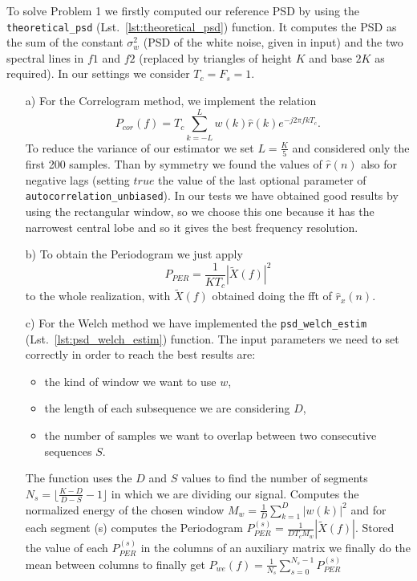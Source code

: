 \documentclass{article}
\newcommand{\inlinecode}[1]{\lstinline[basicstyle=\ttfamily,
    keywordstyle={}]{#1}}
\newcommand{\abs}[1]{\left|#1\right|}
\begin{document}
To solve Problem 1 we firstly computed our reference PSD by using the \inlinecode{theoretical_psd} (Lst.~\ref{lst:theoretical_psd}) function. It computes the PSD as the sum of the constant $\sigma_w^2$ (PSD of the white noise, given in input) and the two spectral lines in $f1$ and $f2$ (replaced by triangles of height $K$ and base $2K$ as required). In our settings we consider $T_c = F_s = 1$.
\begin{itemize}
\item[a)] For the Correlogram method, we implement the relation
  \[ P_{cor}(f) = T_c \sum_{k=-L}^{L} w(k)\hat{r}(k)e^{-j 2 \pi  f k T_c} . \]
  To reduce the variance of our estimator we set $L=\frac{K}{5}$ and considered only the first 200 samples. Than by symmetry we found the values of $\hat{r}(n)$ also for negative lags (setting $true$ the value of the last optional parameter of \inlinecode{autocorrelation_unbiased}). In our tests we have obtained good results by using the rectangular window, so we choose this one because it has the narrowest central lobe and so it gives the best frequency resolution.
 \item[b)] To obtain the Periodogram we just apply
   \[ P_{PER} = \frac{1}{K T_c} |\tilde{X}(f)|^2 \]
   to the whole realization, with $\tilde{X}(f)$ obtained doing the fft of $\hat{r}_x(n)$.
 \item[c)] For the Welch method we have implemented the \inlinecode{psd_welch_estim} (Lst.~\ref{lst:psd_welch_estim}) function. The input parameters we need to set correctly in order to reach the best results are:
 \begin{itemize}
 \item the kind of window we want to use $w$,
 \item the length of each subsequence we are considering $D$, 
 \item the number of samples we want to overlap between two consecutive sequences $S$. 
\end{itemize} 
The function uses the $D$ and $S$ values to find the number of segments $N_s = \bigl\lfloor \frac{K-D}{D-S} -1\bigl\rfloor $ in which we are dividing our signal. Computes the normalized energy of the chosen window $M_w = \frac{1}{D} \sum_{k=1}^{D} {\abs{w(k)}^2} $ and for each segment (s) computes the Periodogram $P_{PER}^{(s)} = \frac{1}{D T_c M_w} |\tilde{X}(f)|$. Stored the value of each $P_{PER}^{(s)}$ in the columns of an auxiliary matrix we finally do the mean between columns to finally get $P_{we}(f) = \frac{1}{N_s} \sum_{s=0}^{N_s-1} P_{PER}^{(s)} $

\end{itemize}
\end{document}

